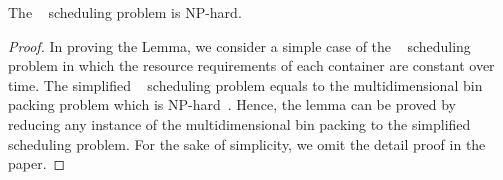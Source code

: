 \begin{lemma}
The \sol~ scheduling problem is NP-hard.
\end{lemma}
\begin{proof}
In proving the Lemma, we consider a simple case of the \sol~ scheduling problem in which the resource
requirements of each container are constant over time. The simplified \sol~ scheduling problem equals to
the multidimensional bin packing problem which is NP-hard~\cite{Bansal:2006:IAA,Meyerson:2013:OMLB,Im:2015:TBO}.
Hence, the lemma can be proved by reducing any instance of the multidimensional bin packing to the simplified \sol~
scheduling problem. For the sake of simplicity, we omit the detail proof in the paper. 
\end{proof}

\begin{comment}
\begin{table}[ht]
\caption{Notation Table}
 \centering
 \small
 \begin{tabular}{c l}
  \hline
  \hline
  $M_{id}$ / $W_{id}$ &  Manager ID / Worker ID \\
  \hline
  $S_{id}$ / $C_{id}$ & Service ID / Container ID \\
  \hline
  $W_j^{k}$ & The total $k$th resource on the $j$th worker node\\
  \hline
  $r_i^{k}(t)$ &  the $k$th resource requirement of \\
  & the $i$th container at time $t$\\
  \hline
  $\{KS\}$ & A set stores known services IDs \\
  \hline
  $DOM(S_{id})$ & A function records dominate resource attribute \\


  \hline
  \hline
\label{table:locations}
\end{tabular}
\end{table}

\end{comment}


